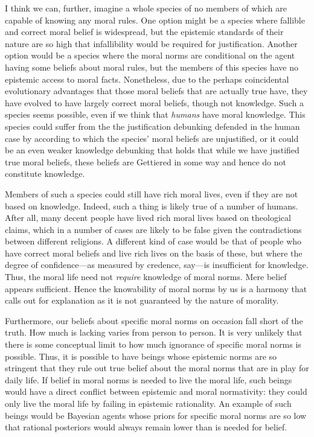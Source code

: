 I think we can, further, imagine a whole species of no members of which are capable of knowing any moral rules. 
One option might be a species where fallible and correct moral belief is widespread, but the epistemic standards of 
their nature are so high that infallibility would be required for justification. Another option would be a species 
where the moral norms are conditional on the agent having some beliefs about moral rules, but the members of this 
species have no epistemic access to moral facts. Nonetheless, due to the perhaps coincidental evolutionary advantages 
that  those moral beliefs that are actually true have, they have evolved to have largely correct moral 
beliefs, though not knowledge. Such a species seems possible, even if we think that \textit{humans} have moral
knowledge. This species could suffer from the the justification debunking defended in the human case 
by  according to which the species' moral beliefs are unjustified, or it could be an even 
weaker knowledge debunking that holds that while we have justified true moral beliefs, these beliefs are Gettiered
in some way and hence do not constitute knowledge. 

Members of such a species could still have rich moral lives, even if they are not based on knowledge. Indeed,
such a thing is likely true of a number of humans. After all, many decent people have lived rich moral lives
based on theological claims, which in a number of cases are likely to be false given the contradictions between 
different religions. A different kind of case would be that of people who have correct moral beliefs and live
rich lives on the basis of these, but where the
degree of confidence---as measured by credence, say---is insufficient for knowledge. 
Thus, the moral life need not \textit{require} knowledge of moral norms. Mere belief appears sufficient. Hence
the knowability of moral norms by us is a harmony that calls out for explanation as it is not guaranteed by the
nature of morality.

Furthermore, our beliefs about specific moral norms on occasion fall short of the truth.
How much is lacking varies from person to person. It is very unlikely that there is some conceptual limit to how much
ignorance of specific moral norms is possible. Thus, it is possible to have beings whose epistemic norms are so stringent
that they rule out true belief about the moral norms that are in play for daily life. If belief in moral norms is needed 
to live the moral life, such beings would have a direct conflict between epistemic and moral normativity: they could only 
live the moral life by failing in epistemic rationality. An example of such beings would be Bayesian agents whose
priors for specific moral norms are so low that rational posteriors would always remain lower than 
is needed for belief.

